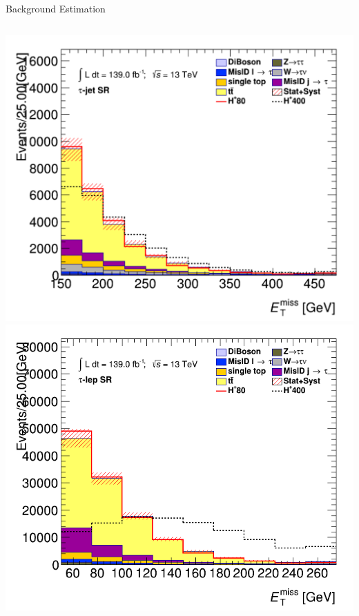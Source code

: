 \documentclass[aspectratio=169,xcolor=table]{beamer}
\begin{document}
\begin{frame}[t]{Background Estimation}
\begin{columns}[t]
        \centering
        \includegraphics[height=.4\textheight,keepaspectratio=true]{met_et_SR_TAUJET.pdf}
        \includegraphics[height=.4\textheight,keepaspectratio=true]{met_et_SR_TAULEP.png}
      \end{columns}
    \end{frame}
\end{document}
